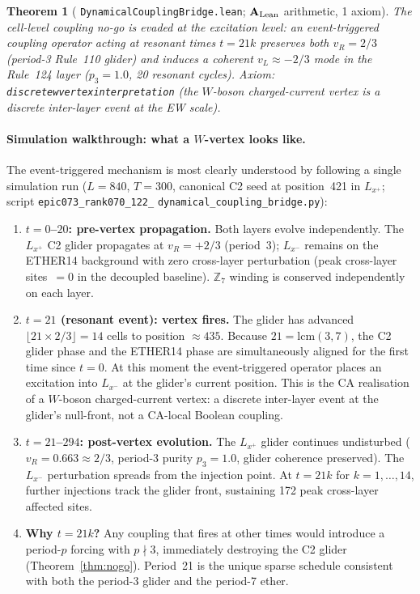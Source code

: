\documentclass[11pt]{article}
\newtheorem{theorem}{Theorem}[section]
\theoremstyle{remark}
\newcommand{\ZS}{\mathbb{Z}_7}
\newcommand{\lean}[1]{%
  \penalty-100
  \begingroup\def\_{\textunderscore\allowbreak}\texttt{#1}\endgroup}
\newcommand{\CatAL}{\ensuremath{\textbf{A}_{\rm Lean}}}
\begin{document}
\begin{theorem}[\lean{DynamicalCouplingBridge.lean}; \CatAL{} arithmetic, 1 axiom]
  \label{thm:event_coupling}
  The cell-level coupling no-go is evaded at the excitation level:
  an event-triggered coupling operator acting at resonant times $t=21k$ preserves
  both $v_R=2/3$ (period-3 Rule~110 glider) and induces a coherent
  $v_L\approx-2/3$ mode in the Rule~124 layer ($p_3=1.0$, 20 resonant cycles).
  Axiom: \lean{discrete\_w\_vertex\_interpretation}
  (the $W$-boson charged-current vertex is a discrete inter-layer event at the
  EW scale).
\end{theorem}

\paragraph{Simulation walkthrough: what a $W$-vertex looks like.}
\label{par:w_vertex_walkthrough}
The event-triggered mechanism is most clearly understood by following a
single simulation run ($L=840$, $T=300$, canonical C2 seed at
position~421 in $L_{x^+}$; script
\texttt{epic073\_rank070\_122\_}%
\texttt{dynamical\_coupling\_bridge.py}):

\begin{enumerate}[label=\textbf{\arabic*.},itemsep=2pt]
  \item \textbf{$t=0$–$20$: pre-vertex propagation.}
    Both layers evolve independently.  The $L_{x^+}$ C2 glider propagates
    at $v_R=+2/3$ (period~3); $L_{x^-}$ remains on the ETHER14 background
    with zero cross-layer perturbation (peak cross-layer sites~$=0$ in the
    decoupled baseline).  $\ZS$ winding is conserved independently on
    each layer.

  \item \textbf{$t=21$ (resonant event): vertex fires.}
    The glider has advanced $\lfloor 21\times2/3\rfloor=14$ cells to
    position $\approx435$.  Because $21=\mathrm{lcm}(3,7)$, the C2 glider
    phase and the ETHER14 phase are simultaneously aligned for the first
    time since $t=0$.  At this moment the event-triggered operator
    places an excitation into $L_{x^-}$ at the glider's current position.
    This is the CA realisation of a $W$-boson charged-current vertex: a
    discrete inter-layer event at the glider's null-front, not a CA-local
    Boolean coupling.

  \item \textbf{$t=21$–$294$: post-vertex evolution.}
    The $L_{x^+}$ glider continues undisturbed ($v_R=0.663\approx2/3$,
    period-3 purity $p_3=1.0$, glider coherence preserved).
    The $L_{x^-}$ perturbation spreads from the injection point.
    At $t=21k$ for $k=1,\ldots,14$, further injections track the glider
    front, sustaining 172 peak cross-layer affected sites.

  \item \textbf{Why $t=21k$?}
    Any coupling that fires at other times would introduce a period-$p$
    forcing with $p\nmid 3$, immediately destroying the C2 glider
    (Theorem~\ref{thm:nogo}).  Period~21 is the unique sparse
    schedule consistent with both the period-3 glider and the period-7 ether.
\end{enumerate}
\end{document}
